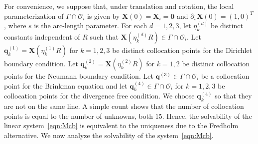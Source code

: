 \documentclass[preprint,11pt]{elsarticle}
\theoremstyle{remark}
\newcommand{\mc}[1]{\mathcal{#1}}
\newcommand{\bm}[1]{\boldsymbol{#1}}
\begin{document}
For convenience, we suppose that, under translation and rotation, the local parameterization of $\Gamma\cap\mc O_i$ is given by $\bm X(0) = \bm X_i = \bm 0$ and $\partial_s \bm X(0) = (1,0)^T$, where $s$ is the arc-length parameter. 
For each $d=1,2,3$, let $\eta_k^{(d)}$ be distinct constants independent of $R$ such that $\bm X(\eta_k^{(d)}R)\in\Gamma\cap\mc O_i$.
Let $\bm q_k^{(1)} = \bm X(\eta_k^{(1)} R)$ for $k = 1,2,3$ be distinct collocation points for the Dirichlet boundary condition. 
Let $\bm q_k^{(2)} = \bm X(\eta_k^{(2)} R)$ for $k = 1,2$ be distinct collocation points for the Neumann boundary condition. 
Let $\bm q^{(3)} \in \Gamma\cap\mc O_i$ be a collocation point for the Brinkman equation and let $\bm q_k^{(4)} \in \Gamma\cap\mc O_i$ for $k=1,2,3$ be collocation points for the divergence free condition. We choose $\bm q_k^{(4)}$ so that they are not on the same line.
A simple count shows that the number of collocation points is equal to the number of unknowns, both $15$.
Hence, the solvability of the linear system~\eqref{eqn:Mcb} is equivalent to the uniqueness due to the Fredholm alternative.
We now analyze the solvability of the system~\eqref{eqn:Mcb}.
\end{document}
